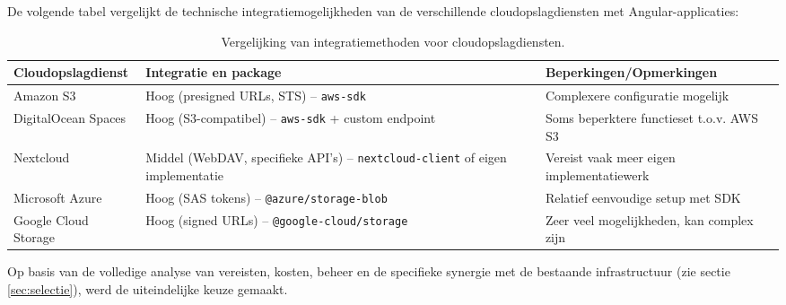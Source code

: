 De volgende tabel vergelijkt de technische integratiemogelijkheden van de verschillende cloudopslagdiensten met Angular-applicaties:

\begin{table}[H]
    \centering
    \footnotesize %
    \begin{tabular}{l p{5cm} p{5cm}} %
      \toprule
      \textbf{Cloudopslagdienst} & \textbf{Integratie en package} & \textbf{Beperkingen/Opmerkingen} \\ %
      \midrule
      Amazon S3 & Hoog (presigned URLs, STS) – \texttt{aws-sdk} & Complexere configuratie mogelijk \\ %
      DigitalOcean Spaces & Hoog (S3-compatibel) – \texttt{aws-sdk} + custom endpoint & Soms beperktere functieset t.o.v. AWS S3 \\ %
      Nextcloud & Middel (WebDAV, specifieke API's) – \texttt{nextcloud-client} of eigen implementatie & Vereist vaak meer eigen implementatiewerk \\ %
      Microsoft Azure & Hoog (SAS tokens) – \texttt{@azure/storage-blob} & Relatief eenvoudige setup met SDK \\ %
      Google Cloud Storage & Hoog (signed URLs) – \texttt{@google-cloud/storage} & Zeer veel mogelijkheden, kan complex zijn \\ %
      \bottomrule
    \end{tabular}
    \caption[Vergelijking cloudintegraties]{\label{tab:cloud-integratie-vergelijking}Vergelijking van integratiemethoden voor cloudopslagdiensten.} %
\end{table}

Op basis van de volledige analyse van vereisten, kosten, beheer en de specifieke synergie met de bestaande infrastructuur (zie sectie \ref{sec:selectie}), werd de uiteindelijke keuze gemaakt.


